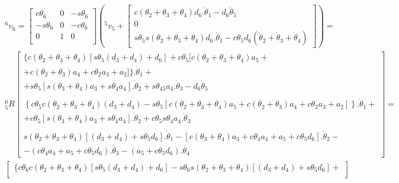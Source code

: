\begin{equation}
\begin{gathered}
    ^6v_6 = \begin{bmatrix}
        c\theta_6 & 0 & -s\theta_6 \\
        -s\theta_6 & 0 & -c\theta_6 \\
        0 & 1 & 0 \\
    \end{bmatrix} \left( ^5v_5 + 
    \begin{bmatrix}
        c(\theta_2 + \theta_3 + \theta_4)d_6.\dot{\theta}_1 - d_6\dot{\theta}_5 \\ 
        0 \\ 
        s\theta_5s(\theta_2 + \theta_3 + \theta_4)d_6.\dot{\theta}_1 - c\theta_5d_6(\dot{\theta}_2 + \dot{\theta}_3 + \dot{\theta}_4)
    \end{bmatrix} \right) = \\
    ^6_5R
    \begin{bmatrix}
        \{c(\theta_2 + \theta_3 + \theta_4)[s\theta_5(d_3+d_4) + d_6] + c\theta_5[c(\theta_2 + \theta_3 + \theta_4)a_5 + \\ 
        + c(\theta_2 + \theta_3)a_4 + c\theta_2a_3 + a_2]\}.\dot{\theta}_1 + \\
        + s\theta_5[s(\theta_3+\theta_4)a_3 + s\theta_4a_4].\dot{\theta}_2 + s\theta_{45}a_4.\dot{\theta}_3 -d_6\dot{\theta}_5\\ 
        \\
        \left\{c\theta_5c(\theta_2 + \theta_3 + \theta_4)(d_3+d_4) - s\theta_5[c(\theta_2 + \theta_3 + \theta_4)a_5 + c(\theta_2 + \theta_3)a_4 + c\theta_2a_3 + a_2]\right\}.\dot{\theta}_1 + \\
        + c\theta_5[s(\theta_3+\theta_4)a_3 + s\theta_4a_4].\dot{\theta}_2 + c\theta_5s\theta_4a_4.\dot{\theta}_3 \\ 
        \\
        s(\theta_2 + \theta_3 + \theta_4)[(d_3+d_4) + s\theta_5d_6].\dot{\theta}_1 - [c(\theta_3+\theta_4)a_3 + c\theta_4a_4 + a_5 + c\theta_5d_6].\dot{\theta}_2 - \\
        -(c\theta_4a_4 + a_5 + c\theta_5d_6).\dot{\theta}_3 - (a_5 + c\theta_5d_6).\dot{\theta_4}
    \end{bmatrix} = \\
    \begin{bmatrix}
        \{c\theta_6c(\theta_2 + \theta_3 + \theta_4)[s\theta_5(d_3+d_4) + d_6] - s\theta_6s(\theta_2 + \theta_3 + \theta_4)[(d_3+d_4) + s\theta_5d_6] + \\

\end{bmatrix}
\end{gathered}
\end{equation}
